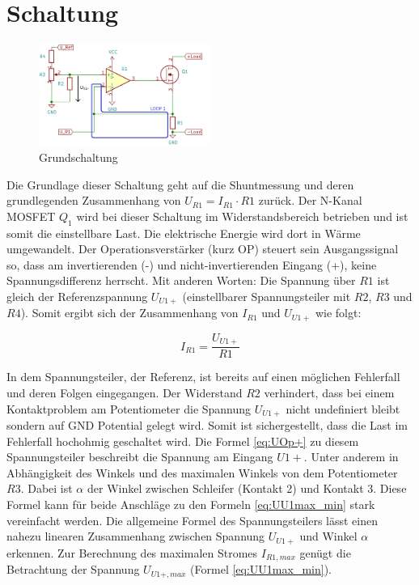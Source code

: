 \section{Schaltung}
\label{sec:Schaltung}

\begin{figure}[!h]
	\centering
	\includegraphics[width=0.5\textwidth]{Bilder/G_Schaltung.PNG}
	\renewcommand*\figurename{Schaltung}
	\caption{Grundschaltung}
	\label{sch:Grundschaltung}
\end{figure}

Die Grundlage dieser Schaltung geht auf die Shuntmessung und deren grundlegenden Zusammenhang von $U_{R1} = I_{R1} \cdot R1$ zurück.
Der N-Kanal MOSFET $Q_{1}$ wird bei dieser Schaltung im Widerstandsbereich betrieben und ist somit die einstellbare Last. 
Die elektrische Energie wird dort in Wärme umgewandelt.
Der Operationsverstärker (kurz OP) steuert sein Ausgangssignal so, dass am invertierenden (-) und nicht-invertierenden Eingang (+), 
keine Spannungsdifferenz herrscht.
Mit anderen Worten: Die Spannung über $R1$ ist gleich der Referenzspannung $U_{U1+}$ 
(einstellbarer Spannungsteiler mit $R2$, $R3$ und $R4$).
Somit ergibt sich der Zusammenhang von $I_{R1}$ und $U_{U1+}$ wie folgt:

\begin{equation}
	I_{R1} = \frac{U_{U1+}}{R1}
	\label{eq:IR1}
\end{equation}

In dem Spannungsteiler, der Referenz, ist bereits auf einen möglichen Fehlerfall und deren Folgen eingegangen.
Der Widerstand $R2$ verhindert, dass bei einem Kontaktproblem am Potentiometer die Spannung $U_{U1+}$ nicht undefiniert bleibt 
sondern auf GND Potential gelegt wird. 
Somit ist sichergestellt, dass die Last im Fehlerfall hochohmig geschaltet wird. 
Die Formel \ref{eq:UOp+} zu diesem Spannungsteiler beschreibt die Spannung am Eingang $U1+$. Unter anderem in Abhängigkeit des Winkels 
und des maximalen Winkels von dem Potentiometer $R3$.
Dabei ist $\alpha$ der Winkel zwischen Schleifer (Kontakt 2) und Kontakt 3.
Diese Formel kann für beide Anschläge zu den Formeln \ref{eq:UU1max_min} stark vereinfacht werden.
Die allgemeine Formel des Spannungsteilers lässt einen nahezu linearen Zusammenhang zwischen Spannung $U_{U1+}$ 
und Winkel $\alpha$ erkennen. Zur Berechnung des maximalen Stromes $I_{R1,max}$ genügt die Betrachtung der Spannung 
$U_{U1+,max}$ (Formel \ref{eq:UU1max_min}).

